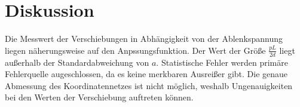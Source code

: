 \section{Diskussion}
\label{sec:Diskussion}

Die Messwert der Verschiebungen in Abhängigkeit von der Ablenkspannung liegen näherungsweise auf den Anpssungsfunktion.
Der Wert der Größe $\frac{pL}{2d}$ liegt außerhalb der Standardabweichung von $a$. Statistische Fehler
werden primäre Fehlerquelle augeschlossen, da es keine merkbaren Ausreißer gibt. Die genaue Abmessung
des Koordinatennetzes ist nicht möglich, weshalb Ungenauigkeiten bei den Werten der Verschiebung auftreten können.
